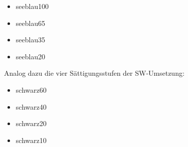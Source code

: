 \begin{itemize}
\item \textcolor{seeblau100}{seeblau100}
\item \textcolor{seeblau65}{seeblau65}
\item \textcolor{seeblau35}{seeblau35}
\item \textcolor{seeblau20}{seeblau20}\\
\end{itemize}

\noindent Analog dazu die vier Sättigungsstufen der SW-Umsetzung:

\begin{itemize}
\item \textcolor{schwarz60}{schwarz60}
\item \textcolor{schwarz40}{schwarz40}
\item \textcolor{schwarz20}{schwarz20}
\item \textcolor{schwarz10}{schwarz10}\\
\end{itemize}




%
%
%
%
%
%
%
%
%
%
%
%
%
%

